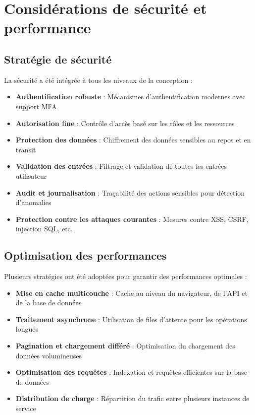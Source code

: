 \section{Considérations de sécurité et performance}

\subsection{Stratégie de sécurité}

La sécurité a été intégrée à tous les niveaux de la conception :

\begin{itemize}
  \item \textbf{Authentification robuste} : Mécanismes d'authentification modernes avec support MFA
  
  \item \textbf{Autorisation fine} : Contrôle d'accès basé sur les rôles et les ressources
  
  \item \textbf{Protection des données} : Chiffrement des données sensibles au repos et en transit
  
  \item \textbf{Validation des entrées} : Filtrage et validation de toutes les entrées utilisateur
  
  \item \textbf{Audit et journalisation} : Traçabilité des actions sensibles pour détection d'anomalies
  
  \item \textbf{Protection contre les attaques courantes} : Mesures contre XSS, CSRF, injection SQL, etc.
\end{itemize}

\subsection{Optimisation des performances}

Plusieurs stratégies ont été adoptées pour garantir des performances optimales :

\begin{itemize}
  \item \textbf{Mise en cache multicouche} : Cache au niveau du navigateur, de l'API et de la base de données
  
  \item \textbf{Traitement asynchrone} : Utilisation de files d'attente pour les opérations longues
  
  \item \textbf{Pagination et chargement différé} : Optimisation du chargement des données volumineuses
  
  \item \textbf{Optimisation des requêtes} : Indexation et requêtes efficientes sur la base de données
  
  \item \textbf{Distribution de charge} : Répartition du trafic entre plusieurs instances de service
\end{itemize}

